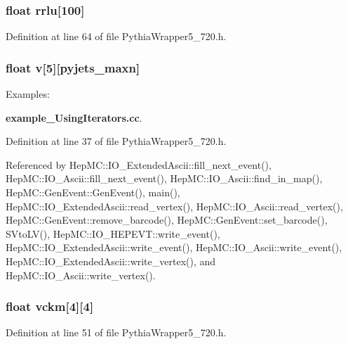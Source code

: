 \subsubsection{\setlength{\rightskip}{0pt plus 5cm}float {\bf rrlu}[100]}\label{PythiaWrapper5__720_8h_dedc0d7247139de829dcdcb23149248e}




Definition at line 64 of file Pythia\-Wrapper5\_\-720.h.
\subsubsection{\setlength{\rightskip}{0pt plus 5cm}float {\bf v}[5][{\bf pyjets\_\-maxn}]}\label{PythiaWrapper5__720_8h_015eddda8d78be6655b61bc37112c89c}


\begin{Desc}
\item[Examples: ]\par
{\bf example\_\-Using\-Iterators.cc}.\end{Desc}


Definition at line 37 of file Pythia\-Wrapper5\_\-720.h.

Referenced by Hep\-MC::IO\_\-Extended\-Ascii::fill\_\-next\_\-event(), Hep\-MC::IO\_\-Ascii::fill\_\-next\_\-event(), Hep\-MC::IO\_\-Ascii::find\_\-in\_\-map(), Hep\-MC::Gen\-Event::Gen\-Event(), main(), Hep\-MC::IO\_\-Extended\-Ascii::read\_\-vertex(), Hep\-MC::IO\_\-Ascii::read\_\-vertex(), Hep\-MC::Gen\-Event::remove\_\-barcode(), Hep\-MC::Gen\-Event::set\_\-barcode(), SVto\-LV(), Hep\-MC::IO\_\-HEPEVT::write\_\-event(), Hep\-MC::IO\_\-Extended\-Ascii::write\_\-event(), Hep\-MC::IO\_\-Ascii::write\_\-event(), Hep\-MC::IO\_\-Extended\-Ascii::write\_\-vertex(), and Hep\-MC::IO\_\-Ascii::write\_\-vertex().
\subsubsection{\setlength{\rightskip}{0pt plus 5cm}float {\bf vckm}[4][4]}\label{PythiaWrapper5__720_8h_cee9ddcc64bbb17cc3e19c8ad1394f34}




Definition at line 51 of file Pythia\-Wrapper5\_\-720.h.
